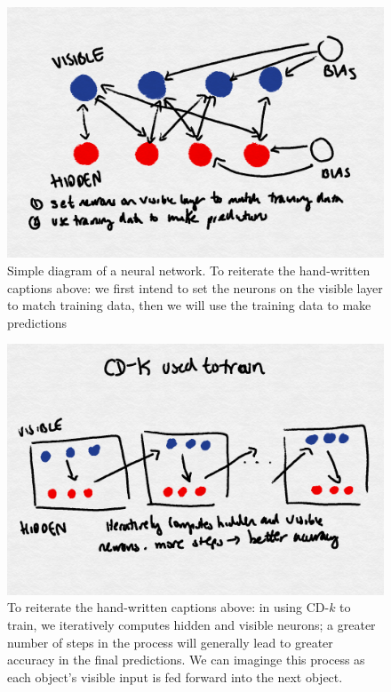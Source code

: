 \begin{figure}
  \centerline{\includegraphics[scale=0.3]{layers_rbm.png}}
  \caption{Simple diagram of a neural network. To reiterate the hand-written captions above: we first intend to set the neurons on the visible layer to match training data, then we will use the training data to make predictions}
\end{figure}

\begin{figure}
  \centerline{\includegraphics[scale=0.3]{cdk-1.png}}
  \caption{To reiterate the hand-written captions above: in using CD-$k$ to train, we iteratively computes hidden and visible neurons; a greater number of steps in the process will generally lead to greater accuracy in the final predictions. We can imaginge this process as each object's visible input is fed forward into the next object. }
\end{figure}


